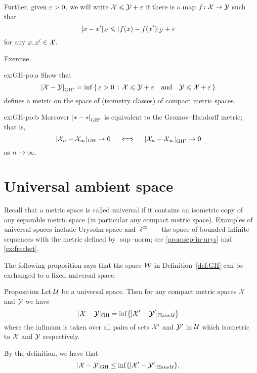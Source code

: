 Further, given $\varepsilon>0$, we will write $\mathcal{X}\leqslant \mathcal{Y}+\varepsilon$
if there is a map $f\colon\mathcal{X}\to \mathcal{Y}$ such that 
$$|x-x'|_{\mathcal{X}}\leqslant|f(x)-f(x')|_{\mathcal{Y}}+\varepsilon$$
for any $x,x'\in \mathcal{X}$.

\begin{thm}{Exercise}\label{ex:GH-po}
\begin{subthm}{ex:GH-po:a}
Show that 
$$\dist{\spc{X}}{\spc{Y}}{\GH'}=\inf\set{\eps>0}{\spc{X}\le \spc{Y}+\eps
\quad\text{and}\quad
\spc{Y}\le \spc{X}+\eps}$$
defines a metric on the space of (isometry classes) of compact metric spaces.
\end{subthm}

\begin{subthm}{ex:GH-po:b}
Moreover $\dist{*}{*}{\GH'}$ is equivalent to the Gromov--Haudorff metric;
that is,
$$|\spc{X}_n-\spc{X}_\infty|_{\GH}\to 0 
\quad\iff\quad 
\dist{\spc{X}_n}{\spc{X}_\infty}{\GH'}\to 0$$ 
as $n\to\infty$.
\end{subthm}
\end{thm}


\section{Universal ambient space}

Recall that a metric space is called universal if it contains an isometric copy of any separable metric space (in particular any compact metric space).
Examples of universal spaces include Urysohn space and $\ell^\infty$ --- the space of bounded infinite sequences with the metric defined by $\sup$-norm; see \ref{prop:sep-in-urys} and \ref{ex:frechet}.

The following proposition says that the space $\mathcal{W}$ in Definition~\ref{def:GH} can be exchanged to a fixed universal space.

\begin{thm}{Proposition}\label{prop:GH-with-fixed-Z}
Let $\mathcal{U}$ be a universal space.
Then for any compact metric spaces $\mathcal{X}$ and $\mathcal{Y}$ we have
$$|\mathcal{X}-\mathcal{Y}|_{\operatorname{\rm GH}\nolimits} = \inf \{|\mathcal{X}'-\mathcal{Y}'|_{\operatorname{\rm Haus}\nolimits\mathcal{U}}\}$$ 
where the infimum is taken over all pairs of sets $\mathcal{X}'$ and $\mathcal{Y}'$ in $\mathcal{U}$
which isometric to  $\mathcal{X}$ and $\mathcal{Y}$ respectively.  
\end{thm}




By the definition, we have that 
\[|\mathcal{X}-\mathcal{Y}|_{\operatorname{\rm GH}\nolimits} \leq \inf \{|\mathcal{X}'-\mathcal{Y}'|_{\operatorname{\rm Haus}\nolimits\mathcal{U}}\}.\]

